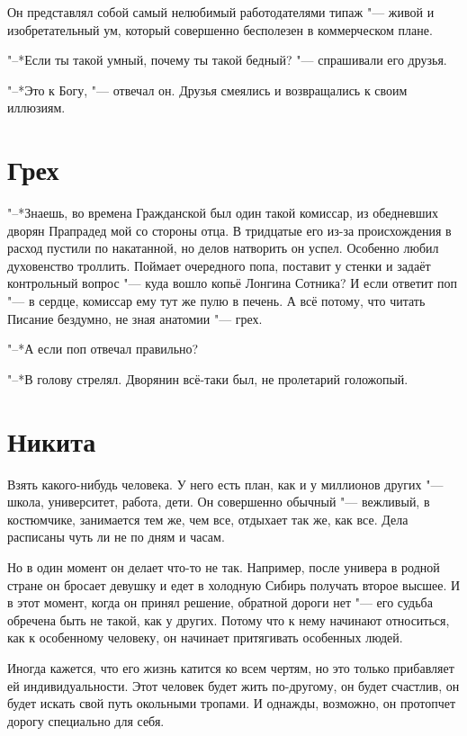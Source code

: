 Он представлял собой самый нелюбимый работодателями типаж "--- живой и изобретательный ум, который совершенно бесполезен в коммерческом плане.

"--*Если ты такой умный, почему ты такой бедный? "--- спрашивали его друзья.

"--*Это к Богу, "--- отвечал он.
Друзья смеялись и возвращались к своим иллюзиям.

\section{Грех}

"--*Знаешь, во времена Гражданской был один такой комиссар, из обедневших дворян\ldotst
Прапрадед мой со стороны отца.
В тридцатые его из-за происхождения в расход пустили по накатанной, но делов натворить он успел.
Особенно любил духовенство троллить.
Поймает очередного попа, поставит у стенки и задаёт контрольный вопрос "--- куда вошло копьё Лонгина Сотника?
И если ответит поп "--- в сердце, комиссар ему тут же пулю в печень.
А всё потому, что читать Писание бездумно, не зная анатомии "--- грех.

"--*А если поп отвечал правильно?

"--*В голову стрелял.
Дворянин всё-таки был, не пролетарий голожопый.

\section{Никита}

Взять какого-нибудь человека.
У него есть план, как и у миллионов других "--- школа, университет, работа, дети.
Он совершенно обычный "--- вежливый, в костюмчике, занимается тем же, чем все, отдыхает так же, как все.
Дела расписаны чуть ли не по дням и часам.

Но в один момент он делает что-то не так.
Например, после универа в родной стране он бросает девушку и едет в холодную Сибирь получать второе высшее.
И в этот момент, когда он принял решение, обратной дороги нет "--- его судьба обречена быть не такой, как у других.
Потому что к нему начинают относиться, как к особенному человеку, он начинает притягивать особенных людей.

Иногда кажется, что его жизнь катится ко всем чертям, но это только прибавляет ей индивидуальности.
Этот человек будет жить по-другому, он будет счастлив, он будет искать свой путь окольными тропами.
И однажды, возможно, он протопчет дорогу специально для себя.

